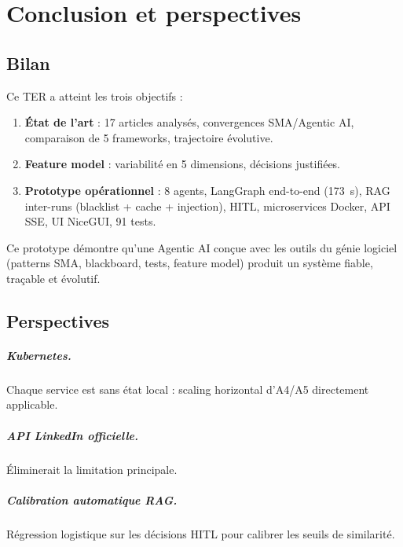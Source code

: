 \documentclass[12pt,a4paper]{report}
\begin{document}
\chapter{Conclusion et perspectives}
\label{chap:conclusion}

\section{Bilan}

Ce TER a atteint les trois objectifs :

\begin{enumerate}
  \item \textbf{État de l'art} : 17 articles analysés, convergences SMA/Agentic AI,
        comparaison de 5 frameworks, trajectoire évolutive.
  \item \textbf{Feature model} : variabilité en 5 dimensions, décisions justifiées.
  \item \textbf{Prototype opérationnel} : 8 agents, LangGraph end-to-end (173~s),
        RAG inter-runs (blacklist + cache + injection), HITL, microservices Docker,
        API SSE, UI NiceGUI, 91 tests.
\end{enumerate}

Ce prototype démontre qu'une Agentic AI conçue avec les outils du génie logiciel
(patterns SMA, blackboard, tests, feature model) produit un système fiable, traçable
et évolutif.

\section{Perspectives}

\paragraph{Kubernetes.} Chaque service est sans état local : scaling horizontal
d'A4/A5 directement applicable.

\paragraph{API LinkedIn officielle.} Éliminerait la limitation principale.

\paragraph{Calibration automatique RAG.} Régression logistique sur les décisions
HITL pour calibrer les seuils de similarité.
\end{document}

